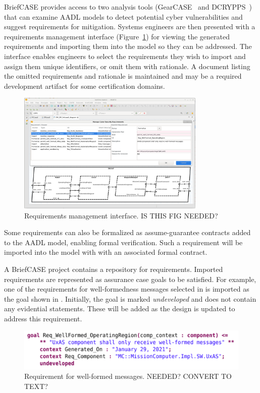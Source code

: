 BriefCASE provides access to two analysis tools (GearCASE~\cite{gearcase2020} and
DCRYPPS~\cite{dcrypps2019}) that can examine AADL models to detect potential cyber vulnerabilities
and suggest requirements for mitigation.
%
Systems engineers are then presented with a requirements management interface
(Figure~\ref{fig:req-mgmt}) for viewing the generated requirements and importing them into the model
so they can be addressed. The interface enables engineers to select the requirements they wish to
import and assign them unique identifiers, or omit them with rationale. A document listing the omitted
requirements and rationale is maintained and may be a required development artifact for some
certification domains. 

\begin{figure}[h]
	\centering
	\includegraphics[width=0.8\textwidth]{figs/req-mgmt.png}
	\caption{Requirements management interface.  IS THIS FIG NEEDED?} 
	\label{fig:req-mgmt} 
\end{figure}

Some requirements can also be formalized as assume-guarantee contracts
added to the AADL model, enabling formal verification. 
Such a requirement will be imported into the model with with an associated formal
contract.

A BriefCASE project contains a repository for requirements. Imported requirements are represented 
as assurance case goals to be satisfied. For example, one of the requirements for well-formedness 
messages selected in  is imported as the goal shown in .
Initially, the goal is marked {\em undeveloped} and does not contain any evidential statements.  
These will be added as the design is updated to address this requirement.  

\begin{figure}[h]
	\centering
	\includegraphics[width=1\columnwidth]{figs/req-wellformed-or.png}
	\caption{Requirement for well-formed messages.  NEEDED? CONVERT TO TEXT?} 
	\label{fig:req-wellformed-or} 
\end{figure}